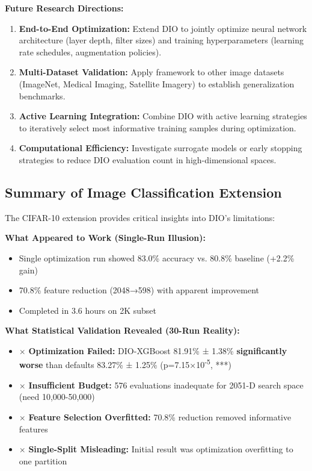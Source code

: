 \documentclass[12pt, a4paper]{article}
\begin{document}
\textbf{Future Research Directions:}
\begin{enumerate}
    \item \textbf{End-to-End Optimization:} Extend DIO to jointly optimize neural network architecture (layer depth, filter sizes) and training hyperparameters (learning rate schedules, augmentation policies).
    
    \item \textbf{Multi-Dataset Validation:} Apply framework to other image datasets (ImageNet, Medical Imaging, Satellite Imagery) to establish generalization benchmarks.
    
    \item \textbf{Active Learning Integration:} Combine DIO with active learning strategies to iteratively select most informative training samples during optimization.
    
    \item \textbf{Computational Efficiency:} Investigate surrogate models or early stopping strategies to reduce DIO evaluation count in high-dimensional spaces.
\end{enumerate}

\subsection{Summary of Image Classification Extension}

The CIFAR-10 extension provides critical insights into DIO's limitations:

\textbf{What Appeared to Work (Single-Run Illusion):}
\begin{itemize}
    \item Single optimization run showed 83.0\% accuracy vs. 80.8\% baseline (+2.2\% gain)
    \item 70.8\% feature reduction (2048→598) with apparent improvement
    \item Completed in 3.6 hours on 2K subset
\end{itemize}

\textbf{What Statistical Validation Revealed (30-Run Reality):}
\begin{itemize}
    \item $\times$ \textbf{Optimization Failed:} DIO-XGBoost 81.91\% ± 1.38\% \textbf{significantly worse} than defaults 83.27\% ± 1.25\% (p=7.15×10\textsuperscript{-5}, ***)
    \item $\times$ \textbf{Insufficient Budget:} 576 evaluations inadequate for 2051-D search space (need 10,000-50,000)
    \item $\times$ \textbf{Feature Selection Overfitted:} 70.8\% reduction removed informative features
    \item $\times$ \textbf{Single-Split Misleading:} Initial result was optimization overfitting to one partition
\end{itemize}
\end{document}

